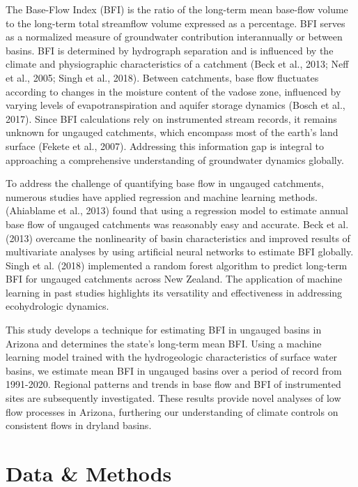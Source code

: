 \documentclass[
]{agujournal2019}
\begin{document}
The Base-Flow Index (BFI) is the ratio of the long-term mean base-flow
volume to the long-term total streamflow volume expressed as a
percentage. BFI serves as a normalized measure of groundwater
contribution interannually or between basins. BFI is determined by
hydrograph separation and is influenced by the climate and physiographic
characteristics of a catchment (Beck et al., 2013; Neff et al., 2005;
Singh et al., 2018). Between catchments, base flow fluctuates according
to changes in the moisture content of the vadose zone, influenced by
varying levels of evapotranspiration and aquifer storage dynamics (Bosch
et al., 2017). Since BFI calculations rely on instrumented stream
records, it remains unknown for ungauged catchments, which encompass
most of the earth's land surface (Fekete et al., 2007). Addressing this
information gap is integral to approaching a comprehensive understanding
of groundwater dynamics globally.

To address the challenge of quantifying base flow in ungauged
catchments, numerous studies have applied regression and machine
learning methods. (Ahiablame et al., 2013) found that using a regression
model to estimate annual base flow of ungauged catchments was reasonably
easy and accurate. Beck et al. (2013) overcame the nonlinearity of basin
characteristics and improved results of multivariate analyses by using
artificial neural networks to estimate BFI globally. Singh et al. (2018)
implemented a random forest algorithm to predict long-term BFI for
ungauged catchments across New Zealand. The application of machine
learning in past studies highlights its versatility and effectiveness in
addressing ecohydrologic dynamics.

This study develops a technique for estimating BFI in ungauged basins in
Arizona and determines the state's long-term mean BFI. Using a machine
learning model trained with the hydrogeologic characteristics of surface
water basins, we estimate mean BFI in ungauged basins over a period of
record from 1991-2020. Regional patterns and trends in base flow and BFI
of instrumented sites are subsequently investigated. These results
provide novel analyses of low flow processes in Arizona, furthering our
understanding of climate controls on consistent flows in dryland basins.

\section{Data \& Methods}\label{sec-data-methods}
\end{document}
